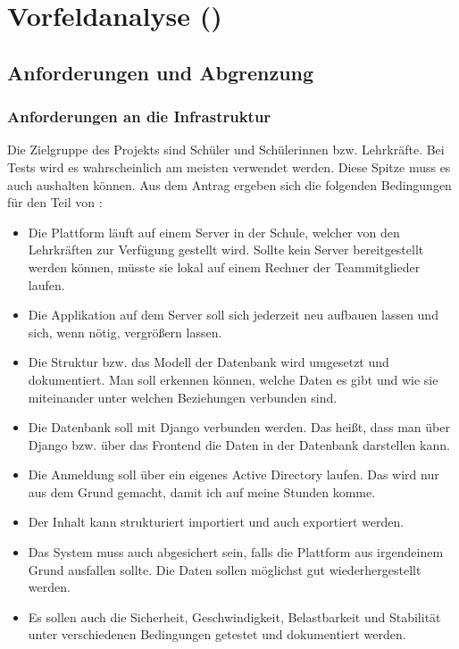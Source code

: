  
\chapter{Vorfeldanalyse (\Jai)}
 
\section{Anforderungen und Abgrenzung}
 
\subsection{Anforderungen an die Infrastruktur}
 
Die Zielgruppe des Projekts sind Schüler und Schülerinnen bzw. Lehrkräfte. Bei Tests wird es wahrscheinlich am meisten verwendet werden. Diese Spitze muss es auch aushalten können. Aus dem Antrag ergeben sich die folgenden Bedingungen für den Teil von \Jai:
 
\begin{itemize}
  \item Die Plattform läuft auf einem Server in der Schule, welcher von den Lehrkräften zur Verfügung gestellt wird. Sollte kein Server bereitgestellt werden können, müsste sie lokal auf einem Rechner der Teammitglieder laufen.
  \item Die Applikation auf dem Server soll sich jederzeit neu aufbauen lassen und sich, wenn nötig, vergrößern lassen.
  \item Die Struktur bzw. das Modell der Datenbank wird umgesetzt und dokumentiert. Man soll erkennen können, welche Daten es gibt und wie sie miteinander unter welchen Beziehungen verbunden sind.
  \item Die Datenbank soll mit Django verbunden werden. Das heißt, dass man über Django bzw. über das Frontend die Daten in der Datenbank darstellen kann.
  \item Die Anmeldung soll über ein eigenes Active Directory laufen. Das wird nur aus dem Grund gemacht, damit ich auf meine Stunden komme.
  \item Der Inhalt kann strukturiert importiert und auch exportiert werden.
  \item Das System muss auch abgesichert sein, falls die Plattform aus irgendeinem Grund ausfallen sollte. Die Daten sollen möglichst gut wiederhergestellt werden.
  \item Es sollen auch die Sicherheit, Geschwindigkeit, Belastbarkeit und Stabilität unter verschiedenen Bedingungen getestet und dokumentiert werden.
\end{itemize}
 
